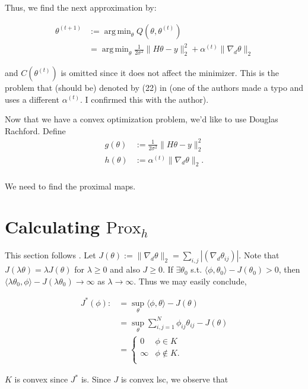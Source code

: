 \documentclass[paper=a4, fontsize=11pt]{scrartcl} %
\DeclareMathOperator*{\argmin}{arg\,min}
\numberwithin{equation}{section} %
\numberwithin{figure}{section} %
\numberwithin{table}{section} %
\newcommand{\prox}{\text{Prox}}
\newcommand{\grad}{\nabla_{d} }
\begin{document}
Thus, we find the next approximation by:

\begin{align*}
  \theta^{(t+1)} &:= \argmin_{\theta} Q(\theta, \theta^{(t)}) \\
  &= \argmin_{\theta}  \frac{1}{2\sigma^2} \|H\theta - y\|_2^2 + \alpha^{(t)} \|\grad \theta\|_2
\end{align*}

and $C(\theta^{(t)})$ is omitted since it does not affect the
minimizer. This is the problem that (should be) denoted by (22) in
\cite{green2015bayesian} (one of the authors made a typo and uses a
different $\alpha^{(t)}$. I confirmed this with the author).

Now that we have a convex optimization problem, we'd like to use Douglas Rachford. 
Define
\begin{align*}
  g(\theta) &:=  \frac{1}{2\sigma^2} \|H\theta - y\|_2^2 \\
  h(\theta) &:= \alpha^{(t)} \|\grad \theta\|_2. \\
\end{align*}

We need to find the proximal maps.


\section{Calculating $\prox_h$}
This section follows \cite{chambolle2004algorithm}. Let $J(\theta) := \|\grad \theta \|_2 = \sum_{i,j} |(\grad \theta_{ij})|$.
Note that $J(\lambda \theta) = \lambda J(\theta)$ for $\lambda \geq 0$ and also $J \geq 0$. If $\exists \theta_0$ s.t.
$\langle \phi,\theta_0 \rangle - J(\theta_0) > 0$,
then $\langle \lambda\theta_0, \phi \rangle - J(\lambda \theta_0) \to \infty$ as $\lambda \to \infty$. Thus we may easily conclude,

\begin{align*}
  J^{*}(\phi) :&= \sup_{\theta} \langle \phi, \theta \rangle - J(\theta) \\
  &= \sup_{\theta} \sum_{i,j = 1}^{N} \phi_{ij} \theta_{ij} - J( \theta ) \\ 
  &= 
  \begin{cases}
    0 & \phi \in K\\
    \infty & \phi \not \in K.\\ 
  \end{cases}
\end{align*}
 
$K$ is convex since $J^{*}$ is. Since $J$ is convex lsc, we observe
that
\end{document}

